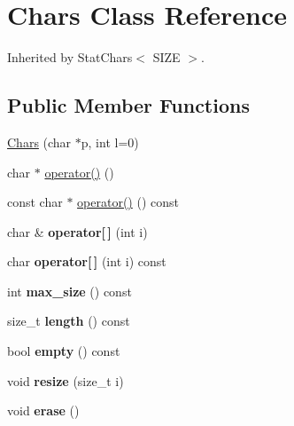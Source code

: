 \hypertarget{class_chars}{}\section{Chars Class Reference}
\label{class_chars}


Inherited by Stat\+Chars$<$ S\+I\+Z\+E $>$.

\subsection*{Public Member Functions}
\begin{DoxyCompactItemize}
\item 
\hyperlink{class_chars_a43b28c71840dc25170e77f8a464409e7}{Chars} (char $\ast$p, int l=0)
\item 
char $\ast$ \hyperlink{class_chars_a8ee96d01f5e65e23f002fd5f25c40c5a}{operator()} ()
\item 
const char $\ast$ \hyperlink{class_chars_ab2000f5df280e316cb9324db9500e93f}{operator()} () const 
\item 
\hypertarget{class_chars_a7d12c1ef929930f508a4bc620a2efca0}{}char \& {\bfseries operator\mbox{[}$\,$\mbox{]}} (int i)\label{class_chars_a7d12c1ef929930f508a4bc620a2efca0}

\item 
\hypertarget{class_chars_a47c4458c1bb2d685f8d7a803859b0de2}{}char {\bfseries operator\mbox{[}$\,$\mbox{]}} (int i) const \label{class_chars_a47c4458c1bb2d685f8d7a803859b0de2}

\item 
\hypertarget{class_chars_ac810def48cbdfab297316b81e7cf0259}{}int {\bfseries max\+\_\+size} () const \label{class_chars_ac810def48cbdfab297316b81e7cf0259}

\item 
\hypertarget{class_chars_a9ba490fdff37c37acf4f4d67cf954627}{}size\+\_\+t {\bfseries length} () const \label{class_chars_a9ba490fdff37c37acf4f4d67cf954627}

\item 
\hypertarget{class_chars_afd539c9ef31f6c7d1568e41f7408722f}{}bool {\bfseries empty} () const \label{class_chars_afd539c9ef31f6c7d1568e41f7408722f}

\item 
\hypertarget{class_chars_adb7057db9d6261b81073d934e4c868d8}{}void {\bfseries resize} (size\+\_\+t i)\label{class_chars_adb7057db9d6261b81073d934e4c868d8}

\item 
\hypertarget{class_chars_a81eaf93caf92de3f7e90071bf6f412c7}{}void {\bfseries erase} ()\label{class_chars_a81eaf93caf92de3f7e90071bf6f412c7}


\end{DoxyCompactItemize}
